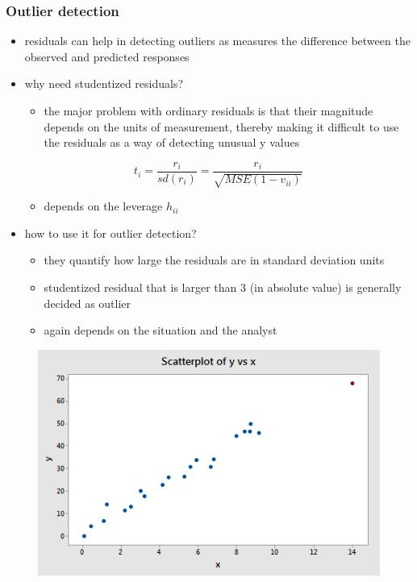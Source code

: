\documentclass[
	11pt, %
]{beamer}
\begin{document}
\begin{frame}[allowframebreaks]
	\frametitle{Outlier detection}
	\begin{itemize}
		\item residuals can help in detecting outliers as measures the difference between the observed and
		predicted responses
		\item why need studentized residuals?
		\begin{itemize}
			\item the major problem with ordinary residuals is that their magnitude depends on the units of measurement,
			thereby making it difficult to use the residuals as a way of detecting unusual y values
		\end{itemize}
		\begin{equation*}
			t_i=\frac{r_i}{sd(r_i)}=\frac{r_i}{\sqrt{MSE(1-v_{ii})}}
		\end{equation*}
		\begin{itemize}
			\item depends on the leverage $h_{ii}$
		\end{itemize}
		\item how to use it for outlier detection?
		\begin{itemize}
			\item  they quantify how large the residuals are in standard deviation
			units
			\item studentized residual that is larger than 3 (in absolute value) is generally decided as
			outlier
			\item again depends on the situation and the analyst
		\end{itemize}
	\end{itemize}
	\begin{figure}
		\includegraphics[scale=0.8]{influ_scatter_06.png}

\end{figure}
\end{frame}
\end{document}
